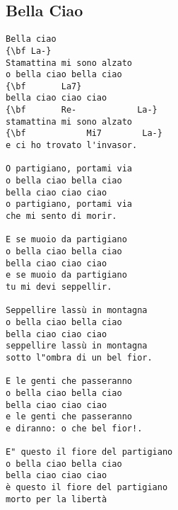 \documentclass[a4paper]{article}
\begin{document}
\subsection{Bella Ciao} %
\label{sub:Bella Ciao}
\begin{Verbatim}[commandchars=\\\{\}]
Bella ciao
{\bf La-}
Stamattina mi sono alzato
o bella ciao bella ciao
{\bf       La7}
bella ciao ciao ciao
{\bf       Re-            La-}
stamattina mi sono alzato
{\bf            Mi7        La-}
e ci ho trovato l'invasor.

O partigiano, portami via
o bella ciao bella ciao
bella ciao ciao ciao
o partigiano, portami via
che mi sento di morir.

E se muoio da partigiano
o bella ciao bella ciao
bella ciao ciao ciao
e se muoio da partigiano
tu mi devi seppellir.

Seppellire lassù in montagna
o bella ciao bella ciao
bella ciao ciao ciao
seppellire lassù in montagna
sotto l"ombra di un bel fior.

E le genti che passeranno
o bella ciao bella ciao
bella ciao ciao ciao
e le genti che passeranno
e diranno: o che bel fior!.

E" questo il fiore del partigiano
o bella ciao bella ciao
bella ciao ciao ciao
è questo il fiore del partigiano
morto per la libertà
\end{Verbatim}
\newpage
\end{document}
